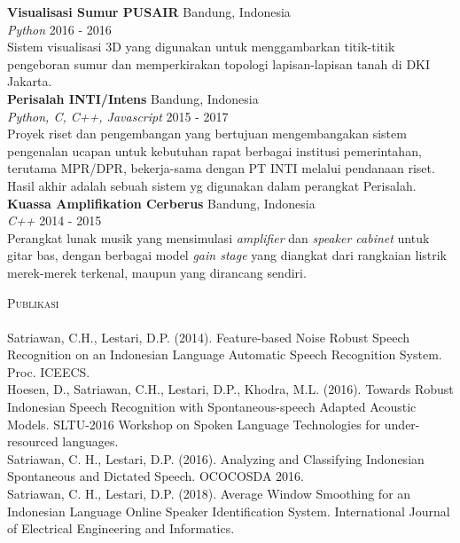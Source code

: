 \documentclass[a4paper]{article}
\newcommand{\lineunder} {
    \vspace*{-8pt} \\
    \hspace*{-18pt} \hrulefill \\
}
\newcommand{\header} [1] {
    {\hspace*{-18pt}\vspace*{6pt} \textsc{#1}}
    \vspace*{-6pt} \lineunder
}
\begin{document}
\vspace*{3mm}
{\textbf{Visualisasi Sumur PUSAIR}}  \hfill Bandung, Indonesia\\
{\sl Python} \hfill 2016 - 2016\\
\vspace*{1mm}
Sistem visualisasi 3D yang digunakan untuk menggambarkan titik-titik pengeboran
sumur dan memperkirakan topologi lapisan-lapisan tanah di DKI Jakarta.\\
\vspace*{3mm}
{\textbf{Perisalah INTI/Intens}}  \hfill Bandung, Indonesia\\
{\sl Python, C, C++, Javascript} \hfill 2015 - 2017\\
\vspace*{1mm}
Proyek riset dan pengembangan yang bertujuan mengembangakan sistem pengenalan
ucapan untuk kebutuhan rapat berbagai institusi pemerintahan, terutama MPR/DPR,
bekerja-sama dengan PT INTI melalui pendanaan riset. Hasil akhir adalah sebuah
sistem yg digunakan dalam perangkat Perisalah.\\
\vspace*{3mm}
{\textbf{Kuassa Amplifikation Cerberus}}  \hfill Bandung, Indonesia\\
{\sl C++} \hfill 2014 - 2015\\
\vspace*{1mm}
Perangkat lunak musik yang mensimulasi \textit{amplifier} dan \textit{speaker
cabinet} untuk gitar bas, dengan berbagai model \textit{gain stage} yang
diangkat dari rangkaian listrik merek-merek terkenal, maupun yang dirancang
sendiri. \\
\vspace*{3mm}

\header{Publikasi}
\vspace{2mm}
Satriawan, C.H., Lestari, D.P. (2014). Feature-based Noise Robust Speech Recognition on an Indonesian Language Automatic Speech Recognition System.
Proc. ICEECS.\\
\vspace*{3mm}
Hoesen, D., Satriawan, C.H., Lestari, D.P., Khodra, M.L. (2016). Towards Robust Indonesian Speech Recognition with Spontaneous-speech Adapted Acoustic Models.
SLTU-2016 Workshop on Spoken Language Technologies for under-resourced
languages.\\
\vspace*{3mm}
Satriawan, C. H., Lestari, D.P. (2016). Analyzing and Classifying Indonesian Spontaneous and Dictated Speech. OCOCOSDA 2016.\\
\vspace*{3mm}
Satriawan, C. H., Lestari, D.P. (2018). Average Window Smoothing for an
Indonesian Language Online Speaker Identification System.
International Journal of Electrical Engineering and Informatics.\\

\ 
\end{document}
